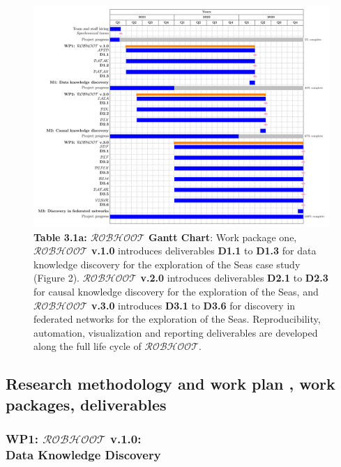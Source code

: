 \documentclass[11pt, a4paper]{article} %
\begin{document}
\begin{figure}[h!]
   \includegraphics[width=1\textwidth]{Figures/GanttChart.pdf}
   \caption*{{\small {\bf Table 3.1a: $\mathcal{ROBHOOT}$ Gantt
         Chart}: Work package one, {\bf $\mathcal{ROBHOOT}$ v.1.0}
       introduces deliverables {\bf D1.1} to {\bf D1.3} for data
       knowledge discovery for the exploration of the Seas case study
       (Figure 2). {\bf $\mathcal{ROBHOOT}$ v.2.0} introduces
       deliverables {\bf D2.1} to {\bf D2.3} for causal knowledge
       discovery for the exploration of the Seas, and {\bf
         $\mathcal{ROBHOOT}$ v.3.0} introduces {\bf D3.1} to {\bf
         D3.6} for discovery in federated networks for the exploration
       of the Seas. Reproducibility, automation, visualization and
       reporting deliverables are developed along the full life cycle
       of $\mathcal{ROBHOOT}$.}}
\end{figure}

  
\subsection{Research methodology and work plan , work packages,
  deliverables}

\subsubsection{{\bf WP1: $\mathcal{ROBHOOT}$ v.1.0}: \\ Data Knowledge
  Discovery}
\end{document}
